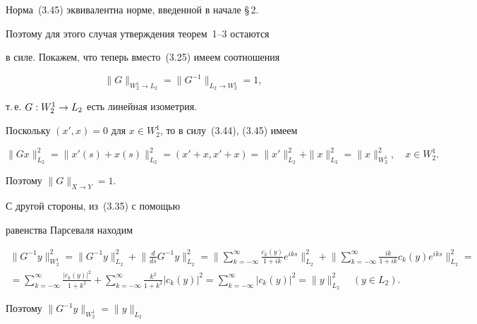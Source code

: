 Норма~(3.45) эквивалентна норме, введенной в начале \S\,2.


Поэтому для этого случая утверждения теорем~1--3 остаются


в силе. Покажем, что теперь вместо~(3.25) имеем соотношения


\begin{equation}


\|G\|_{{W_2^1\rightarrow L_2}} =\|G^{-1}\|_{{L_2\rightarrow W_2^1}} =1,


\end{equation}


т.\,е. $G : W_2^1 \to L_2$ есть линейная изометрия. 





Поскольку $(x',x)=0$ для $x\in W_2^1$, то в силу~(3.44), (3.45) имеем


$$


\|Gx\|_{{L_2}}^2=\|x'(s)+x(s)\|_{{L_2}}^2=(x'+x,x'+x)=


\|x'\|_{{L_2}}^2+\|x\|_{{L_2}}^2=


\|x\|_{{W_2^1}}^2,\quad x\in W_2^1 .


$$


Поэтому $\|G\|_{{X\rightarrow Y}} =1$.


С другой стороны, из~(3.35) с помощью


равенства Парсеваля находим


\begin{multline*}


\|G^{-1}y\|_{{W_2^1}}^2=\|G^{-1}y\|_{{L_2}}^2+\bigg\|


\frac{d}{ds}G^{-1}y\bigg\|_{{L_2}}^2=


\bigg\| \sum_{k=-\infty}^\infty


\frac{c_k(y)}{1+ik}e^{iks}\bigg\|_{{L_2}}^2+


\bigg\|\sum_{k=-\infty}^\infty


\frac{ik}{1+ik}c_k(y)e^{iks}\bigg\|_{{L_2}}^2= \\


%


=\sum_{k=-\infty}^\infty \frac{|c_k(y)|^2}{1+k^2}+


\sum_{k=-\infty}^\infty \frac{k^2}{1+k^2}|c_k(y)|^2=


\sum_{k=-\infty}^\infty |c_k(y)|^2 =\|y\|_{{L_2}}^2\quad (y\in L_2).


\end{multline*}


Поэтому $\|G^{-1}y\|_{{W_2^1}} =\|y\|_{{L_2}}$


